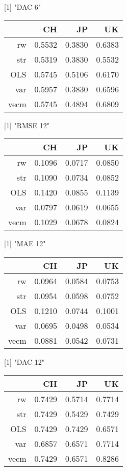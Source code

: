 [1] "DAC 6"
\begin{table}[ht]
\centering
\begin{tabular}{rrrr}
  \hline
 & CH & JP & UK \\ 
  \hline
rw & 0.5532 & 0.3830 & 0.6383 \\ 
  str & 0.5319 & 0.3830 & 0.5532 \\ 
  OLS & 0.5745 & 0.5106 & 0.6170 \\ 
  var & 0.5957 & 0.3830 & 0.6596 \\ 
  vecm & 0.5745 & 0.4894 & 0.6809 \\ 
   \hline
\end{tabular}
\end{table}
[1] "RMSE 12"
\begin{table}[ht]
\centering
\begin{tabular}{rrrr}
  \hline
 & CH & JP & UK \\ 
  \hline
rw & 0.1096 & 0.0717 & 0.0850 \\ 
  str & 0.1090 & 0.0734 & 0.0852 \\ 
  OLS & 0.1420 & 0.0855 & 0.1139 \\ 
  var & 0.0797 & 0.0619 & 0.0655 \\ 
  vecm & 0.1029 & 0.0678 & 0.0824 \\ 
   \hline
\end{tabular}
\end{table}
[1] "MAE 12"
\begin{table}[ht]
\centering
\begin{tabular}{rrrr}
  \hline
 & CH & JP & UK \\ 
  \hline
rw & 0.0964 & 0.0584 & 0.0753 \\ 
  str & 0.0954 & 0.0598 & 0.0752 \\ 
  OLS & 0.1210 & 0.0744 & 0.1001 \\ 
  var & 0.0695 & 0.0498 & 0.0534 \\ 
  vecm & 0.0881 & 0.0542 & 0.0731 \\ 
   \hline
\end{tabular}
\end{table}
[1] "DAC 12"
\begin{table}[ht]
\centering
\begin{tabular}{rrrr}
  \hline
 & CH & JP & UK \\ 
  \hline
rw & 0.7429 & 0.5714 & 0.7714 \\ 
  str & 0.7429 & 0.5429 & 0.7429 \\ 
  OLS & 0.7429 & 0.7429 & 0.6571 \\ 
  var & 0.6857 & 0.6571 & 0.7714 \\ 
  vecm & 0.7429 & 0.6571 & 0.8286 \\ 
   \hline
\end{tabular}
\end{table}